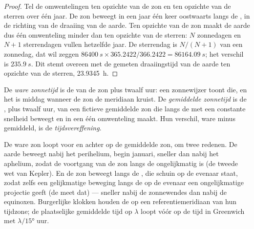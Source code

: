 \begin{proof}
Tel de omwentelingen ten opzichte van de zon en ten opzichte van de sterren
over één jaar. De zon beweegt in een jaar één keer oostwaarts langs de
, in de richting van de draaiing van de aarde. Ten opzichte van de zon
maakt de aarde dus één omwenteling minder dan ten opzichte van de sterren:
$N$ zonnedagen en $N + 1$ sterrendagen vullen hetzelfde jaar. De sterrendag is
$N/(N+1)$ van een zonnedag, dat wil zeggen
$\qty{86400}{s}\times 365.2422/366.2422 = \qty{86164.09}{s}$; het verschil is
$\qty{235.9}{s}$. Dit stemt overeen met de gemeten draaiingstijd van de aarde ten
opzichte van de sterren, \qty{23.9345}{h}.
\end{proof}

\begin{definition}[Zonnetijd]\label{def:b1:spherical-astronomy:solar-time}
De \emph{ware zonnetijd} is de  van de zon plus
twaalf uur: een zonnewijzer toont die, en het is middag wanneer de zon de
meridiaan kruist. De \emph{gemiddelde zonnetijd} is
de , plus twaalf uur, van een fictieve gemiddelde zon die langs de
 met een constante snelheid beweegt en in een  één
omwenteling maakt. Hun verschil, ware minus gemiddeld, is de
\emph{tijdsvereffening}.
\end{definition}

De ware zon loopt voor en achter op de gemiddelde zon, om twee redenen. De aarde
beweegt nabij het perihelium, begin januari, sneller dan nabij het aphelium, zodat
de voortgang van de zon langs de  ongelijkmatig is (de tweede wet van
Kepler). En de zon beweegt langs de , die schuin op de evenaar staat,
zodat zelfs een gelijkmatige beweging langs de  op de evenaar een
ongelijkmatige projectie geeft (de  meet dat) --- sneller nabij de
zonnewendes dan nabij de equinoxen. Burgerlijke klokken houden de  op een referentiemeridiaan van hun tijdzone; de plaatselijke
gemiddelde tijd op  $\lambda$ loopt vóór op de tijd in Greenwich met
$\lambda/\ang{15}$ uur.


